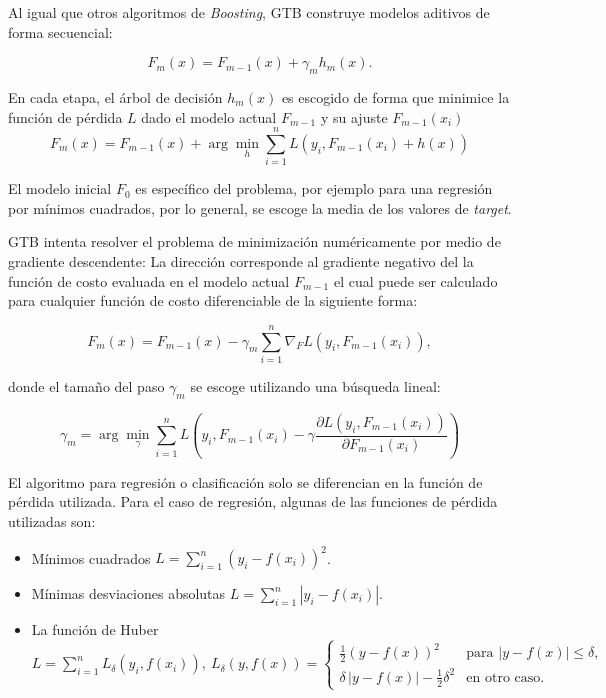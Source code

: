 \documentclass[spanish]{article}
\begin{document}
          Al igual que otros algoritmos de \emph{Boosting}, GTB construye modelos aditivos de forma secuencial:
          
          \begin{equation}
            F_m(x) = F_{m-1}(x) + \gamma_m h_m(x).
          \end{equation}
           
          En cada etapa, el árbol de decisión $h_m(x)$ es escogido de forma que minimice la función de pérdida 
          $L$ dado el modelo actual $F_{m-1}$ y su ajuste $F_{m-1}(x_i)$
          \begin{equation}
            F_m(x) = F_{m-1}(x) + \arg\min_{h} \sum_{i=1}^{n} L(y_i, F_{m-1}(x_i) + h(x))
          \end{equation}
           
          El modelo inicial $F_{0}$ es específico del problema, por ejemplo para una regresión por mínimos 
          cuadrados, por lo general, se escoge la media de los valores de \emph{target}. \medskip
          
          GTB intenta resolver el problema de minimización numéricamente por medio de gradiente descendente: 
          La dirección corresponde al gradiente  negativo del la función de costo evaluada en el modelo actual 
          $F_{m-1}$ el cual puede ser calculado para cualquier función de costo diferenciable de la siguiente forma:

          \begin{equation}
            F_m(x) = F_{m-1}(x) - \gamma_m \sum_{i=1}^{n} \nabla_F L(y_i, F_{m-1}(x_i)),
          \end{equation}
          
          donde el tamaño del paso $\gamma_m$ se escoge utilizando una búsqueda lineal:
          
          \begin{equation}
            \gamma_m = \arg\min_{\gamma} \sum_{i=1}^{n} L\left(y_i, F_{m-1}(x_i) - 
              \gamma \frac{\partial L(y_i, F_{m-1}(x_i))}{\partial F_{m-1}(x_i)}\right)
          \end{equation}
           
          El algoritmo para regresión o clasificación solo se diferencian en la función de pérdida utilizada. 
          Para el caso de regresión, algunas de las funciones de pérdida utilizadas son:
          \begin{itemize}
            \item Mínimos cuadrados $L = \sum_{i=1}^n (y_i - f(x_i))^2$.
            \item Mínimas desviaciones absolutas $L = \sum_{i=1}^n |y_i - f(x_i)|$.
            \item La función de Huber $L = \sum_{i=1}^n L_{\delta}(y_i, f(x_i)), ~ 
              L_{\delta }(y,f(x))=\begin{cases}{\frac  {1}{2}}(y-f(x))^{2} & {\textrm{para }}|y-f(x)|\leq 
              \delta ,\\ \delta \,|y-f(x)|-{\frac  {1}{2}}\delta ^{2} & {\textrm{en otro caso.}}\end{cases}$
          \end{itemize}
            
\end{document}
